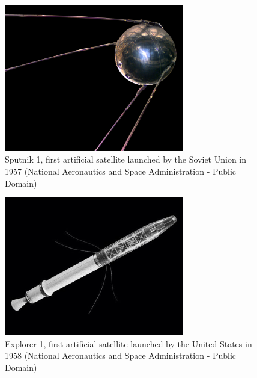\begin{figure}[H]
\centerline{\includegraphics[width=0.7\textwidth]{images/sputnik.jpg}}
\caption{Sputnik 1, first artificial satellite launched by the Soviet Union in 1957  (National Aeronautics and Space Administration - Public Domain)}
\label{f1.1}
\end{figure}


\begin{figure}[H]
\centerline{\includegraphics[width=0.7\textwidth]{images/explorer1.jpg}}
\caption{Explorer 1, first artificial satellite launched by the United States in 1958 (National Aeronautics and Space Administration - Public Domain)}
\label{f1.2}
\end{figure}
\pagebreak

